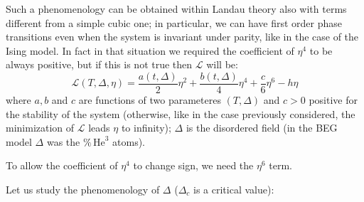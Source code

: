 \documentclass[../main/main.tex]{subfiles}
\begin{document}
Such a phenomenology can be obtained within Landau theory also with terms different from a simple cubic one; in particular, we can have first order phase transitions even when the system is invariant under parity, like in the case of the Ising model. In fact in that situation we required the coefficient of \( \eta ^4 \) to be always positive, but if this is not true then \( \mathcal{L} \) will be:
\begin{equation}
  \mathcal{L} (T, \Delta, \eta ) = \frac{a (t,\Delta )}{2} \eta ^2 + \frac{b(t,\Delta )}{4} \eta ^4 + \frac{c}{6} \eta ^6 - h \eta
\end{equation}
where \( a,b \) and \( c \) are functions of two parameteres \( (T,\Delta ) \) and \( c>0 \) positive for the stability of the system (otherwise, like in the case previously considered, the minimization of \( \mathcal{L} \) leads \( \eta  \) to infinity); \( \Delta  \) is the disordered field (in the BEG model \( \Delta  \) was the \( \% \, \text{He}^3\) atoms).

\begin{remark}
To allow the coefficient of \( \eta ^4 \) to change sign, we need the \( \eta ^6 \) term.
\end{remark}



Let us study the phenomenology of \( \Delta  \) (\( \Delta _c \) is a critical value):
\end{document}
